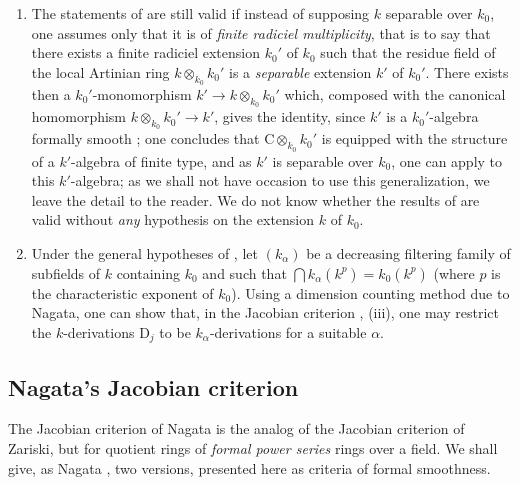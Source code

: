 \begin{remark}[22.6.9]
\label{0.22.6.9}
\begin{enumerate}
  \item[\rm{(i)}] The statements of  are still valid if instead of supposing $k$ separable over $k_0$, one assumes only that it is of \emph{finite radiciel multiplicity}, that is to say  that there exists a finite radiciel extension $k_0'$ of $k_0$ such that the residue field of the local Artinian ring $k\otimes_{k_0}k_0'$ is a \emph{separable} extension $k'$ of $k_0'$.
  There exists then a $k_0'$-monomorphism $k'\to k\otimes_{k_0}k_0'$ which, composed with the canonical homomorphism $k\otimes_{k_0}k_0'\to k'$, gives the identity, since $k'$ is a $k_0'$-algebra formally smooth ; one concludes that $\mathrm{C}\otimes_{k_0}k_0'$ is equipped with the structure of a $k'$-algebra of finite type, and as $k'$ is separable over $k_0$, one can apply  to this $k'$-algebra; as we shall not have occasion to use this generalization, we leave the detail to the reader.
  We do not know whether the results of  are valid without \emph{any} hypothesis on the extension $k$ of $k_0$.
  \item[\rm{(ii)}] Under the general hypotheses of , let $(k_\alpha)$ be a decreasing filtering family of subfields of $k$ containing $k_0$ and such that $\bigcap k_\alpha(k^p)=k_0(k^p)$ (where $p$ is the characteristic exponent of $k_0$).
  Using a dimension counting method due to Nagata, one can show that, in the Jacobian criterion , (iii), one may restrict the $k$-derivations $\mathrm{D}_j$ to be $k_\alpha$-derivations for a suitable $\alpha$.
\end{enumerate}
\end{remark}

\subsection{Nagata's Jacobian criterion}
\label{subsection:0.22.7}

\begin{env}[22.7.1]
\label{0.22.7.1}
The Jacobian criterion of Nagata is the analog of the Jacobian criterion of Zariski, but for quotient rings of \emph{formal power series} rings over a field.
We shall give, as Nagata \cite{IV-31}, two versions, presented here as criteria of formal smoothness.
\end{env}

